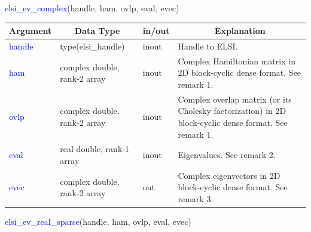 \documentclass{report}
\begin{document}
\begin{labeling}{\hspace{6cm}}
\item [\hspace{0.3cm} \textcolor{blue}{elsi\_ev\_complex}(handle, ham, ovlp, eval, evec)]
\end{labeling}

\begin{tabular}[]{|p{20mm}|p{45mm}|p{15mm}|p{85mm}|}
\hline
\multicolumn{1}{|c|}{\textbf{Argument}} & \multicolumn{1}{c|}{\textbf{Data Type}} & \multicolumn{1}{c|}{\textbf{in/out}} & \multicolumn{1}{c|}{\textbf{Explanation}}\\
\hline
\textcolor{blue}{handle} & type(elsi\_handle)           & inout & Handle to ELSI.\\
\hline
\textcolor{blue}{ham}    & complex double, rank-2 array & inout & Complex Hamiltonian matrix in 2D block-cyclic dense format.  See remark 1.\\
\hline
\textcolor{blue}{ovlp}   & complex double, rank-2 array & inout & Complex overlap matrix (or its Cholesky factorization) in 2D block-cyclic dense format.  See remark 1.\\
\hline
\textcolor{blue}{eval}   & real double, rank-1 array    & inout & Eigenvalues.  See remark 2.\\
\hline
\textcolor{blue}{evec}   & complex double, rank-2 array & out   & Complex eigenvectors in 2D block-cyclic dense format.  See remark 3.\\
\hline
\end{tabular}

\begin{labeling}{\hspace{6cm}}
\item [\hspace{0.3cm} \textcolor{blue}{elsi\_ev\_real\_sparse}(handle, ham, ovlp, eval, evec)]
\end{labeling}
\end{document}
